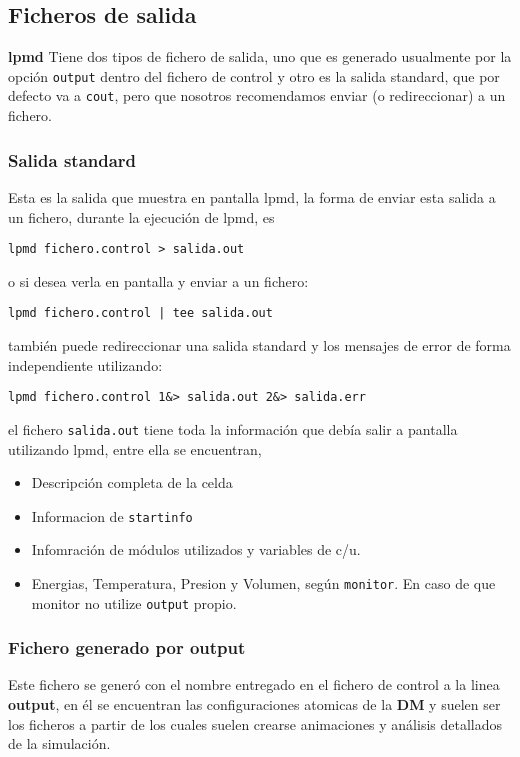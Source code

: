 \documentclass[a4paper,10pt]{scrbook}
\newcommand{\lpmd}{\textbf{lpmd }}
\newcommand{\control}[1]{\begin{center}\begin{minipage}{10cm}\texttt{#1}\end{minipage}\end{center}}
\begin{document}
\subsection{Ficheros de salida}
\lpmd Tiene dos tipos de fichero de salida, uno que es generado usualmente por la opci\'on \verb|output| dentro del fichero de control y otro es la salida standard, que por defecto va a \verb|cout|, pero que nosotros recomendamos enviar (o redireccionar) a un fichero.

\subsubsection{Salida standard}
Esta es la salida que muestra en pantalla lpmd, la forma de enviar esta salida a un fichero, durante la ejecuci\'on de lpmd, es

\control{lpmd fichero.control > salida.out}

o si desea verla en pantalla y enviar a un fichero:

\control{lpmd fichero.control | tee salida.out}

tambi\'en puede redireccionar una salida standard y los mensajes de error de forma independiente utilizando:

\control{lpmd fichero.control 1\&> salida.out 2\&> salida.err}

el fichero \verb|salida.out| tiene toda la informaci\'on que deb\'ia salir a pantalla utilizando lpmd, entre ella se encuentran,

\begin{itemize}
 \item Descripci\'on completa de la celda
 \item Informacion de \verb|startinfo|
 \item Infomraci\'on de m\'odulos utilizados y variables de c/u.
 \item Energias, Temperatura, Presion y Volumen, seg\'un \verb|monitor|. En caso de que monitor no utilize \verb|output| propio.
\end{itemize}


\subsubsection{Fichero generado por output}
Este fichero se gener\'o con el nombre entregado en el fichero de control a la linea \textbf{output}, en \'el se encuentran las configuraciones atomicas de la \textbf{DM} y suelen ser los ficheros a partir de los cuales suelen crearse animaciones y an\'alisis detallados de la simulaci\'on.
\end{document}
